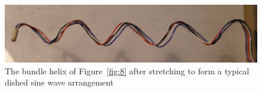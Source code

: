 %

\begin{figure}[!h]
  \centering
  \includegraphics[width=1.1\textwidth]{fig9.jpg}
  \caption{The bundle helix of Figure~\ref{fig:8} after stretching to form a typical dished sine wave arrangement}
  \label{fig:9}
\end{figure}

%

